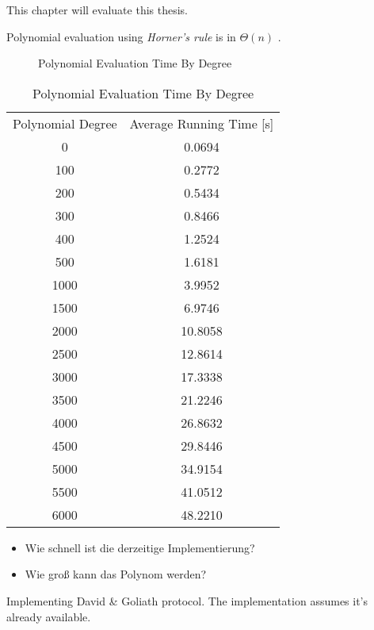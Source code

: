\label{sec:evaluation}

This chapter will evaluate this thesis.

Polynomial evaluation using \emph{Horner's rule} is in $\Theta(n)$
\cite{cormen01}.

\begin{figure}[ht]
  \centering
  
  \caption{Polynomial Evaluation Time By Degree}
  \label{fig:poly-deg-t}
\end{figure}

\begin{table}[ht]
  \centering
  \begin{tabular}{|c|c|}
    Polynomial Degree & Average Running Time [s] \\
    0 & 0.0694 \\
    100 & 0.2772 \\
    200 & 0.5434 \\
    300 & 0.8466 \\
    400 & 1.2524 \\
    500 & 1.6181 \\
    1000 &  3.9952 \\
    1500 &  6.9746 \\
    2000 & 10.8058 \\
    2500 & 12.8614 \\
    3000 & 17.3338 \\
    3500 & 21.2246 \\
    4000 & 26.8632 \\
    4500 & 29.8446 \\
    5000 & 34.9154 \\
    5500 & 41.0512 \\
    6000 & 48.2210 \\
  \end{tabular}
  \caption{Polynomial Evaluation Time By Degree}
  \label{tab:poly-deg-t}
\end{table}

\begin{JWtodoBox}

\begin{itemize}

\item Wie schnell ist die derzeitige Implementierung?

\item Wie groß kann das Polynom werden?

\end{itemize}

\end{JWtodoBox}



Implementing David \& Goliath protocol. The implementation assumes it's already
available.
